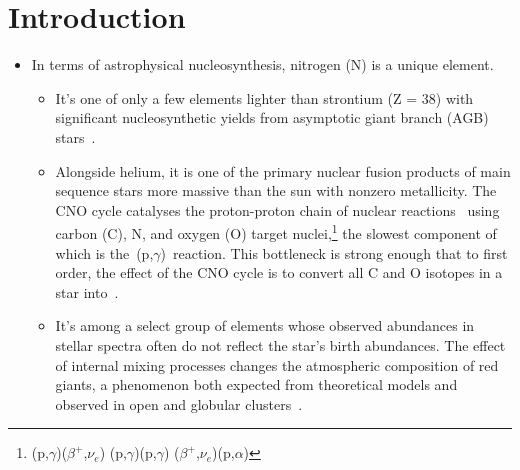 \documentclass[ms.tex]{subfiles}
\begin{document}
 

\section{Introduction} 
\label{sec:intro} 
\begin{itemize} 
	\item In terms of astrophysical nucleosynthesis, nitrogen (N) is a unique 
	element. 
	\begin{itemize} 
		\item It's one of only a few elements lighter than strontium (Z = 38) 
		with significant nucleosynthetic yields from asymptotic giant branch 
		(AGB) stars~\citep{Johnson2019}. 

		\item Alongside helium, it is one of the primary nuclear fusion 
		products of main sequence stars more massive than the sun with nonzero 
		metallicity. 
		The CNO cycle catalyses the proton-proton chain of nuclear 
		reactions~\citep*[e.g.][]{Suliga2020} using carbon (C), N, and oxygen 
		(O) target nuclei,\footnote{
			\Ctwelve(p,$\gamma$)\Nthirteen($\beta^+$,$\nu_e$)\Cthirteen 
			(p,$\gamma$)\Nfourteen(p,$\gamma$)\Ofifteen
			($\beta^+$,$\nu_e$)\Nfifteen(p,$\alpha$)\Ctwelve 
		} the slowest component of which is 
		the~\Nfourteen(p,$\gamma$)\Ofifteen~reaction. 
		This bottleneck is strong enough that to first order, the effect of the 
		CNO cycle is to convert all C and O isotopes in a star into~\Nfourteen. 

		\item It's among a select group of elements whose observed abundances 
		in stellar spectra often do not reflect the star's birth abundances. 
		The effect of internal mixing processes changes the atmospheric 
		composition of red giants, a phenomenon both expected from theoretical 
		models and observed in open and globular clusters~\citep{Gilroy1989, 
		Korn2007, Lind2008, Souto2018, Souto2019}. 
	\end{itemize} 

\end{itemize}
\end{document}

